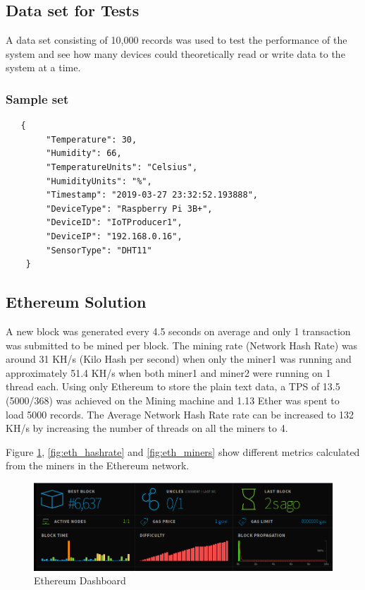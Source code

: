 \documentclass[11pt,openright]{report}
\begin{document}
\subsection{Data set for Tests}
A data set consisting of 10,000 records was used to test the performance of the system and see how many devices could theoretically read or write data to the system at a time.

\subsubsection{Sample set}
\begin{verbatim}
   {
        "Temperature": 30,
        "Humidity": 66,
        "TemperatureUnits": "Celsius",
        "HumidityUnits": "%",
        "Timestamp": "2019-03-27 23:32:52.193888",
        "DeviceType": "Raspberry Pi 3B+",
        "DeviceID": "IoTProducer1",
        "DeviceIP": "192.168.0.16",
        "SensorType": "DHT11"
    }
\end{verbatim}

\subsection{Ethereum Solution}
A new block was generated every 4.5 seconds on average and only 1 transaction was submitted to be mined per block. The mining rate (Network Hash Rate) was around 31 KH/s (Kilo Hash per second) when only the miner1 was running and approximately 51.4 KH/s when both miner1 and miner2 were running on 1 thread each. Using only Ethereum to store the plain text data, a TPS of 13.5 (5000/368) was achieved on the Mining machine and 1.13 Ether was spent to load 5000 records. The Average Network Hash Rate rate can be increased to 132 KH/s by increasing the number of threads on all the miners to 4.

Figure \ref{fig:eth_dashboard}, \ref{fig:eth_hashrate} and \ref{fig:eth_miners} show different metrics calculated from the miners in the Ethereum network.

\begin{figure}
    \centering
    \includegraphics[scale=0.8]{results/Dashboard.png}
    \caption{Ethereum Dashboard}
    \label{fig:eth_dashboard}
\end{figure}
\end{document}
